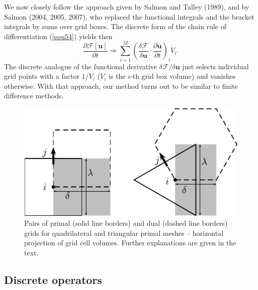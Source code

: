We now closely follow the approach given by Salmon and Talley (1989), and by Salmon (2004, 2005, 2007), who replaced the functional integrals and the bracket integrals by sums over grid boxes. The discrete form of the chain rule of differentiation (\ref{equ54}) yields then
\begin{equation}
\frac{\partial\mathcal{F}[\mathbf{u}]}{\partial t}\Rightarrow\sum_{i=1}^M\left(\frac{\delta \mathcal{F}}{\delta\mathbf{u}}
\cdot\frac{\partial \mathbf{u}}{\partial t}\right)_i V_i.\label{chainrule}
\end{equation}
The discrete analogue of the functional derivative $\delta\mathcal{F}/\delta{\mathbf{u}}$ just selects individual grid points with a factor $1/V_i$ ($V_i$ is the $i$-th grid box volume) and vanishes otherwise. With that approach, our method turns out to be similar to finite difference methods.

\begin{figure}
%
\begin{center}
\includegraphics{fig_primal_dual.pdf}
\end{center}
\caption{Pairs of primal (solid line borders) and dual (dashed line borders) grids for quadrilateral and triangular primal meshes -- horizontal projection of grid cell volumes. Further explanations are given in the text.}
\label{grid}
\end{figure}

\subsection{Discrete operators}

